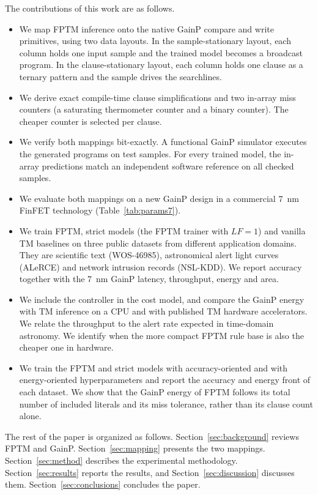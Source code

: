 \documentclass[preprint,review,12pt]{elsarticle}
\newcommand{\gainp}{GainP}
\newcommand{\LF}{\mathit{LF}}
\newcommand{\wosnew}[1]{#1}   %
\begin{document}
The contributions of this work are as follows.
\begin{itemize}
    \item We map FPTM inference onto the native \gainp{} compare and write primitives, using two data layouts. In the sample-stationary layout, each column holds one input sample and the trained model becomes a broadcast program. In the clause-stationary layout, each column holds one clause as a ternary pattern and the sample drives the searchlines.
    \item We derive exact compile-time clause simplifications and two in-array miss counters (a saturating thermometer counter and a binary counter). The cheaper counter is selected per clause.
    \item We verify both mappings bit-exactly. A functional \gainp{} simulator executes the generated programs on test samples. For every trained model, the in-array predictions match an independent software reference on all checked samples.
    \item We evaluate both mappings on a new \gainp{} design in a commercial 7~nm FinFET technology (Table~\ref{tab:params7}).
    \item We train FPTM, strict models (the FPTM trainer with $\LF=1$) and vanilla TM baselines on three public datasets from different application domains. They are scientific text (WOS-46985), astronomical alert light curves (ALeRCE) and network intrusion records (NSL-KDD). We report accuracy together with the 7~nm \gainp{} latency, throughput, energy and area.
    \item We include the controller in the cost model, and compare the \gainp{} energy with TM inference on a CPU and with published TM hardware accelerators. We relate the throughput to the alert rate expected in time-domain astronomy. We identify when the more compact FPTM rule base is also the cheaper one in hardware.
    \item \wosnew{We train the FPTM and strict models with accuracy-oriented and with energy-oriented hyperparameters and report the accuracy and energy front of each dataset. We show that the \gainp{} energy of FPTM follows its total number of included literals and its miss tolerance, rather than its clause count alone.}
\end{itemize}

The rest of the paper is organized as follows.
Section~\ref{sec:background} reviews FPTM and \gainp{}.
Section~\ref{sec:mapping} presents the two mappings.
Section~\ref{sec:method} describes the experimental methodology.
Section~\ref{sec:results} reports the results, and Section~\ref{sec:discussion} discusses them.
Section~\ref{sec:conclusions} concludes the paper.
\end{document}
